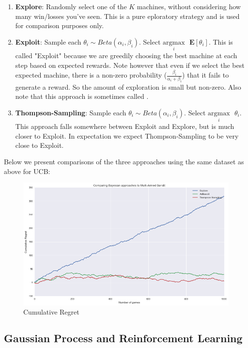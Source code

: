 \documentclass{article}
\begin{document}
\begin{enumerate}
\item \textbf{Explore}: Randomly select one of the $K$ machines, without considering how many win/losses you've seen. This is a pure eploratory strategy and is used for comparison purposes only.
\item \textbf{Exploit}: Sample each $\theta_i \sim Beta(\alpha_i, \beta_i)$. Select $\underset{i}{\text{argmax}}\text{ }\mathbf{E}[\theta_i]$. This is called {"Exploit"} because we are greedily choosing the best machine at each step based on expected rewards. Note however that even if we select the best expected machine, there is a non-zero probability ($\frac{\beta_i}{\alpha_i + \beta_i}$) that it fails to generate a reward. So the amount of exploration is small but non-zero. Also note that this approach is sometimes called .
\item \textbf{Thompson-Sampling}: Sample each $\theta_i \sim Beta(\alpha_i, \beta_i)$. Select $\underset{i}{\text{argmax}}\text{ }\theta_i$. This approach falls somewhere between Exploit and Explore, but is much closer to Exploit. In expectation we expect Thompson-Sampling to be very close to Exploit.
\end{enumerate}

Below we present comparisons of the three approaches using the same dataset as above for UCB:

\begin{figure}[H]
\centering
\includegraphics[scale=0.5]{Bayesian_regret.png}
\caption{Cumulative Regret}
\end{figure}

\subsection{Gaussian Process and Reinforcement Learning}
\end{document}
